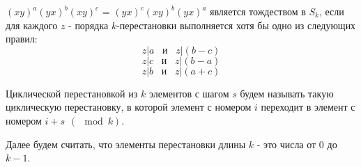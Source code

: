 		$(xy)^a(yx)^b(xy)^c$ = $(yx)^c(xy)^b(yx)^a$ является тождеством в $S_k$, если для каждого $z$ - порядка $k$-перестановки выполняется хотя бы одно из следующих правил:
	\begin{equation} \label{3blocks 1st cond}
	z|a \hspace{10pt} \text{и} \hspace{10pt} z|(b-c)
	\end{equation}
	\begin{equation}
	z|c \hspace{10pt} \text{и} \hspace{10pt} z|(b-a)
	\end{equation}
	\begin{equation} \label{3blocks 3rd cond}
	z|b \hspace{10pt} \text{и} \hspace{10pt} z|(a+c)
	\end{equation}
	
	\begin{definition}
		Циклической перестановкой из $k$ элементов с шагом $s$ будем называть такую циклическую перестановку, в которой элемент с номером $i$ переходит в элемент с номером $i+s \hspace{5pt} (\mod k)$. 
	\end{definition}
	
	Далее будем считать, что элементы перестановки длины $k$ - это числа от $0$ до $k-1$.
	
	\begin{comment}
	\begin{lemma} \label{existence_of_clockwise_and_vv}
	Существуют такие перестановки $x$ и $y$ из $S_k$, что $xy$ - циклическая перестановка с шагом -1, а $yx$ - циклическая перестановка с шагом 1.
	\end{lemma}
	\begin{proof}
	Рассмотрим перестановку $x$: $i \rightarrow -i (\mod k)$ и $y$: $i \rightarrow -i+1 (\mod k)$.
	$$
	x = 
	\begin{pmatrix}
	0&1&2&3&...&k-3&k-2&k-1\\
	0&k-1&k-2&k-3&...&3&2&1
	\end{pmatrix}
	$$
	
	$$
	y = 
	\begin{pmatrix}
	0&1&2&3&...&k-3&k-2&k-1\\
	1&0&k-1&k-2&...&4&3&2
	\end{pmatrix}
	$$
	
	Тогда 
	
	$xy$: $i \xrightarrow y (-i+1) \xrightarrow x (-(-i+1)) == i-1$,
	
	$yx$: $i \xrightarrow x (-i) \xrightarrow y (-(-i)+1) == i+1$
	
	\end{proof}
	\end{comment}
	
